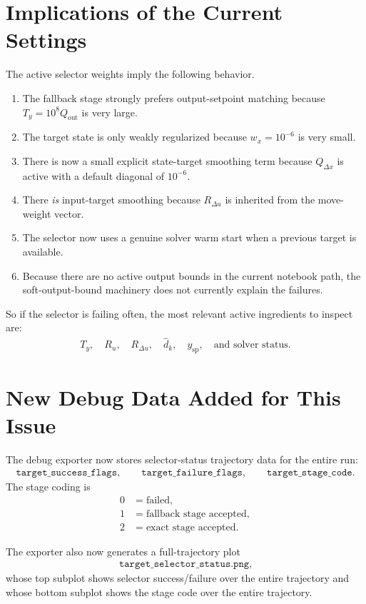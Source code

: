 \documentclass[11pt]{article}
\begin{document}
\section{Implications of the Current Settings}
The active selector weights imply the following behavior.
\begin{enumerate}
\item The fallback stage strongly prefers output-setpoint matching because $T_y = 10^8 Q_{\mathrm{out}}$ is very large.
\item The target state is only weakly regularized because $w_x = 10^{-6}$ is very small.
\item There is now a small explicit state-target smoothing term because $Q_{\Delta x}$ is active with a default diagonal of $10^{-6}$.
\item There \emph{is} input-target smoothing because $R_{\Delta u}$ is inherited from the move-weight vector.
\item The selector now uses a genuine solver warm start when a previous target is available.
\item Because there are no active output bounds in the current notebook path, the soft-output-bound machinery does not currently explain the failures.
\end{enumerate}

So if the selector is failing often, the most relevant active ingredients to inspect are:
\begin{align}
T_y,\quad R_u,\quad R_{\Delta u},\quad \hat d_k,\quad y_{\mathrm{sp}},\quad \text{and solver status}.
\end{align}

\section{New Debug Data Added for This Issue}
The debug exporter now stores selector-status trajectory data for the entire run:
\begin{align}
\texttt{target\_success\_flags},\qquad
\texttt{target\_failure\_flags},\qquad
\texttt{target\_stage\_code}.
\end{align}
The stage coding is
\begin{align}
0 &= \text{failed},\\
1 &= \text{fallback stage accepted},\\
2 &= \text{exact stage accepted}.
\end{align}

The exporter also now generates a full-trajectory plot
\begin{align}
\texttt{target\_selector\_status.png},
\end{align}
whose top subplot shows selector success/failure over the entire trajectory and whose bottom subplot shows the stage code over the entire trajectory.
\end{document}
